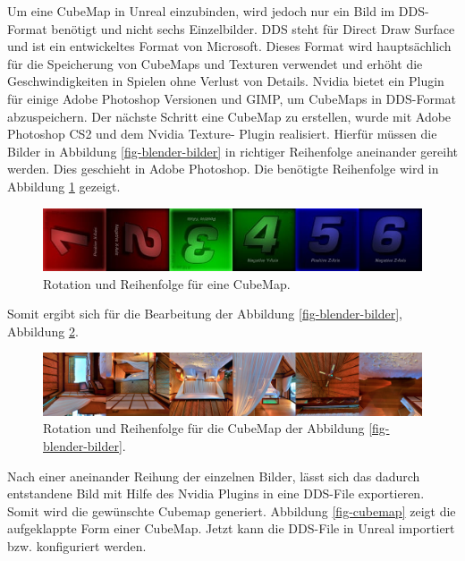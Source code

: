 Um eine CubeMap in Unreal einzubinden, wird jedoch nur ein Bild im DDS-Format benötigt und nicht sechs Einzelbilder. 
DDS steht für Direct Draw Surface und ist ein entwickeltes Format von Microsoft. 
Dieses Format wird hauptsächlich für die Speicherung von CubeMaps und Texturen verwendet und erhöht die Geschwindigkeiten in Spielen ohne Verlust von Details\cite{dateiendungen19}.
Nvidia bietet ein Plugin für einige Adobe Photoshop Versionen und GIMP, um CubeMaps in DDS-Format abzuspeichern.
Der nächste Schritt eine CubeMap zu erstellen, wurde mit Adobe Photoshop CS2 und dem Nvidia Texture- Plugin realisiert. 
Hierfür müssen die Bilder in Abbildung \ref{fig-blender-bilder} in richtiger Reihenfolge aneinander gereiht werden. 
Dies geschieht in Adobe Photoshop. 
Die benötigte Reihenfolge wird in Abbildung \ref{fig-rotation} gezeigt. \\

\begin{figure}[H] \centering
\includegraphics[width=\textwidth]{Images/rotation.png} 
\caption[Rotation und Reihenfolge für eine CubeMap]{Rotation und Reihenfolge für eine CubeMap\cite{franczak19}.}
\label{fig-rotation} 
\end{figure}


Somit ergibt sich für die Bearbeitung der Abbildung \ref{fig-blender-bilder}, Abbildung \ref{fig-blender-bilder2}. \\

\begin{figure}[H] \centering
\includegraphics[width=\textwidth]{Images/blender-bilder2.png} 
\caption{Rotation und Reihenfolge für die CubeMap der Abbildung \ref{fig-blender-bilder}.}
\label{fig-blender-bilder2} 
\end{figure}


Nach einer aneinander Reihung der einzelnen Bilder, lässt sich das dadurch entstandene Bild mit Hilfe des Nvidia Plugins in eine DDS-File exportieren. 
Somit wird die gewünschte Cubemap generiert.
Abbildung \ref{fig-cubemap} zeigt die aufgeklappte Form einer CubeMap.
Jetzt kann die DDS-File in Unreal importiert bzw. konfiguriert werden. \\

